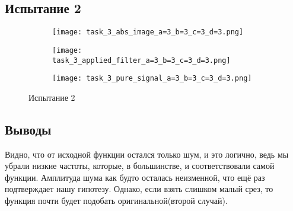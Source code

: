 \newpage
\subsection{Испытание 2}

\begin{figure}[!ht]
	\centering
\hspace*{\fill}%
	\begin{subfigure}[b]{0.30\textwidth}
        \centering
		\texttt{[image: task\_3\_abs\_image\_a=3\_b=3\_c=3\_d=3.png]}
		\caption{}
	
	\end{subfigure}
\hfill
	\begin{subfigure}[b]{0.30\textwidth}
        \centering
		\texttt{[image: task\_3\_applied\_filter\_a=3\_b=3\_c=3\_d=3.png]}
        \caption{}
		
	\end{subfigure}
\hspace*{\fill}%
\par\vspace{\abovecaptionskip}
        \begin{subfigure}[b]{0.30\textwidth}
        \centering
		\texttt{[image: task\_3\_pure\_signal\_a=3\_b=3\_c=3\_d=3.png]}
		\caption{}
	
	\end{subfigure}
	\caption{Испытание 2}
\end{figure}



\newpage
\subsection{Выводы}
Видно, что от исходной функции остался только шум, и это логично, ведь мы убрали низкие частоты, которые, в большинстве, 
и соответствовали самой функции. Амплитуда шума как будто осталась неизменной, что ещё раз подтверждает нашу гипотезу. Однако, если взять слишком малый срез, то функция почти будет подобать оригинальной(второй случай).

\endinput